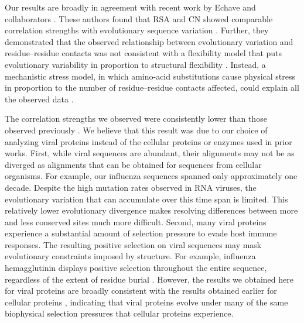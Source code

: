 \documentclass[smallextended]{svjour3}
\begin{document}
Our results are broadly in agreement with recent work by Echave and collaborators \citep{Yehetal2014,Huangetal2014}. These authors found that RSA and CN showed comparable correlation strengths with evolutionary sequence variation \citep{Yehetal2014}. Further, they demonstrated that the observed relationship between evolutionary variation and residue--residue contacts was not consistent with a flexibility model that puts evolutionary variability in proportion to structural flexibility \citep{Huangetal2014}. Instead, a mechanistic stress model, in which amino-acid substitutions cause physical stress in proportion to the number of residue--residue contacts affected, could explain all the observed data \citep{Huangetal2014}.

The correlation strengths we observed were consistently lower than those observed previously \citep{Jacksonetal2013,Yehetal2014}. We believe that this result was due to our choice of analyzing viral proteins instead of the cellular proteins or enzymes used in prior works. First, while viral sequences are abundant, their alignments may not be as diverged as alignments that can be obtained for sequences from cellular organisms. For example, our influenza sequences spanned only approximately one decade. Despite the high mutation rates observed in RNA viruses, the evolutionary variation that can accumulate over this time span is limited. This relatively lower evolutionary divergence makes resolving differences between more and less conserved sites much more difficult. Second, many viral proteins experience a substantial amount of selection pressure to evade host immune responses. The resulting positive selection on viral sequences may mask evolutionary constraints imposed by structure. For example, influenza hemagglutinin displays positive selection throughout the entire sequence, regardless of the extent of residue burial \citep{MeyerWilke2013,Meyeretal2013,Suzuki2006,Bushetal1999}. However, the results we obtained here for viral proteins are broadly consistent with the results obtained earlier for cellular proteins \citep{DokholyanShakhnovich2001,FranzosaXia2009,Jacksonetal2013,Yehetal2014}, indicating that viral proteins evolve under many of the same biophysical selection pressures that cellular proteins experience.
\end{document}
